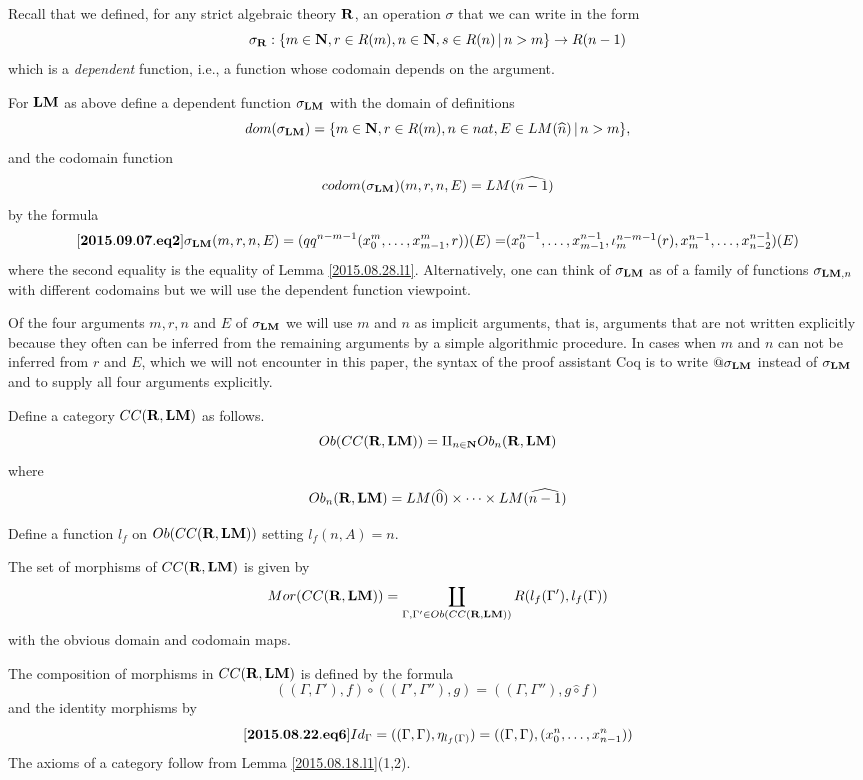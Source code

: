 \documentclass[11pt]{article}
\newenvironment{eq}{\begin{equation}}{\end{equation}}
\newcommand{\llabel}[1]{\label{#1}[{\bf #1}]}
\newcommand{\sr}{\rightarrow}
\newcommand{\nn}{{\bf N\rm}}
\newcommand{\nat}{\nn}
\newcommand{\rr}{{\bf R}}
\newcommand{\lm}{{\bf LM}}
\newcommand{\wh}{\widehat}
\newcommand{\hc}{\wh{\circ}}
\begin{document}
Recall that we defined, for any strict algebraic theory $\rr$, an operation $\sigma$ that we can write in the form
%
$$\sigma_{\rr}:\{m\in\nat,r\in R(m),n\in\nat,s\in R(n)\,|\,n>m\}\sr R(n-1)$$
%
which is a {\em dependent} function, i.e., a function whose codomain depends on the argument. 

For $\lm$ as above define a dependent function $\sigma_{\lm}$ with the domain of definitions 
%
$$dom(\sigma_{\lm})=\{m\in\nat,r\in R(m),n\in nat, E\in LM(\wh{n})\,|\,n>m\},$$
%
and the codomain function
%
$$codom(\sigma_{\lm})(m,r,n,E)=LM(\wh{n-1})$$
%
by the formula
%
\begin{eq}\llabel{2015.09.07.eq2}
\sigma_{\lm}(m,r,n,E)=(qq^{n-m-1}(x_0^m,\dots,x_{m-1}^m,r))(E)=$$
$$(x_0^{n-1},\dots,x_{m-1}^{n-1},\iota_m^{n-m-1}(r),x_m^{n-1},\dots, x_{n-2}^{n-1})(E)
\end{eq}
%
where the second equality is the equality of Lemma \ref{2015.08.28.l1}. Alternatively, one can think of $\sigma_{\lm}$ as of a family of functions $\sigma_{\lm,n}$ with different codomains but we will use the dependent function viewpoint.

Of the four arguments $m,r,n$ and $E$ of $\sigma_{\lm}$ we will use $m$ and $n$ as implicit arguments, that is, arguments that are not written explicitly because they often can be inferred from the remaining arguments by a simple algorithmic procedure. In cases when $m$ and $n$ can not be inferred from $r$ and $E$, which we will not encounter in this paper, the syntax of the proof assistant Coq is to write $@\sigma_{\lm}$ instead of $\sigma_{\lm}$ and to supply all four arguments explicitly. 

Define a category $CC(\rr,\lm)$ as follows.
%
$$Ob(CC(\rr,\lm))=\amalg_{n\in\nat} Ob_n(\rr,\lm)$$
%
where 
%
$$Ob_n(\rr,\lm)=LM(\wh{0})\times\dots\times LM(\wh{n-1})$$
%


Define a function $l_f$ on $Ob(CC(\rr,\lm))$ setting $l_f(n,A)=n$.

The set of morphisms of $CC(\rr,\lm)$ is given by
%
$$Mor(CC(\rr,\lm))=\coprod_{\Gamma,\Gamma'\in Ob(CC(\rr,\lm))} R(l_f(\Gamma'),l_f(\Gamma))$$
%
with the obvious domain and codomain maps. 

The composition of morphisms in $CC(\rr,\lm)$ is defined by the formula
%
$$((\Gamma,\Gamma'),f)\circ ((\Gamma',\Gamma''),g)=((\Gamma,\Gamma''), g\hc f)$$
%
and the identity morphisms by
%
\begin{eq}\llabel{2015.08.22.eq6}
Id_{\Gamma}=((\Gamma,\Gamma), \eta_{l_f(\Gamma)})=((\Gamma,\Gamma),(x^n_0,\dots,x^n_{n-1}))
\end{eq}
%
The axioms of a category follow from Lemma \ref{2015.08.18.l1}(1,2). 
\end{document}

